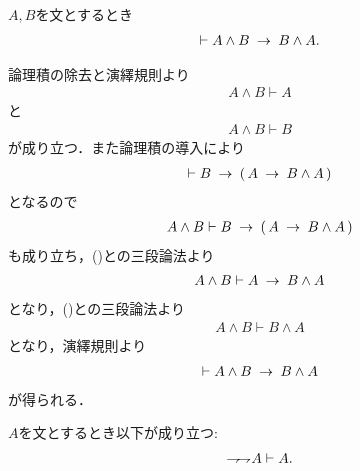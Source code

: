 	\begin{screen}
		\begin{logicalthm}[論理積の可換律]
		\label{logicalthm:commutative_law_of_conjunction}
			$A,B$を文とするとき
			\begin{align}
				\vdash A \wedge B \hspace{0.25em}\rightarrow\hspace{0.25em} B \wedge A.
			\end{align}
		\end{logicalthm}
	\end{screen}
	
	\begin{prf}
		論理積の除去と演繹規則より
		\begin{align}
			A \wedge B \vdash A
			\label{fom:logicalthm_commutative_law_of_conjunction_1}
		\end{align}
		と
		\begin{align}
			A \wedge B \vdash B
			\label{fom:logicalthm_commutative_law_of_conjunction_2}
		\end{align}
		が成り立つ．また論理積の導入により
		\begin{align}
			\vdash B \hspace{0.25em}\rightarrow\hspace{0.25em} (\, A \hspace{0.25em}\rightarrow\hspace{0.25em} B \wedge A\, )
		\end{align}
		となるので
		\begin{align}
			A \wedge B \vdash B \hspace{0.25em}\rightarrow\hspace{0.25em} (\, A \hspace{0.25em}\rightarrow\hspace{0.25em} B \wedge A\, )
		\end{align}
		も成り立ち，()との三段論法より
		\begin{align}
			A \wedge B \vdash A \hspace{0.25em}\rightarrow\hspace{0.25em} B \wedge A
		\end{align}
		となり，()との三段論法より
		\begin{align}
			A \wedge B \vdash B \wedge A
		\end{align}
		となり，演繹規則より
		\begin{align}
			\vdash A \wedge B \hspace{0.25em}\rightarrow\hspace{0.25em} B \wedge A
		\end{align}
		が得られる．
		\QED
	\end{prf}
	
	\begin{screen}
		\begin{logicalaxm}[二重否定の除去]
		\label{logicalaxm:elimination_of_double_negation}
			$A$を文とするとき以下が成り立つ:
			\begin{align}
				\rightharpoondown\hspace{-0.25em} \rightharpoondown\hspace{-0.25em} A \vdash A.
			\end{align}
		\end{logicalaxm}
	\end{screen}
	
